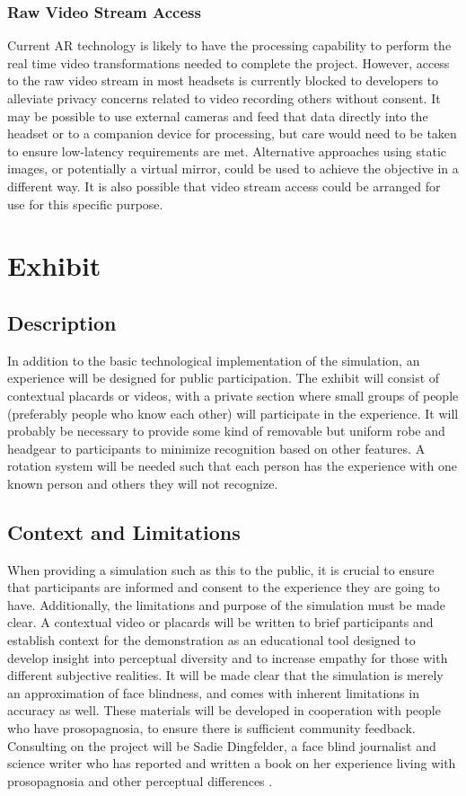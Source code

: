\documentclass{article}
\begin{document}
    \subsubsection{Raw Video Stream Access}
    Current AR technology is likely to have the processing capability to perform the real time video transformations needed to complete the project. However, access to the raw video stream in most headsets is currently blocked to developers to alleviate privacy concerns related to video recording others without consent. It may be possible to use external cameras and feed that data directly into the headset or to a companion device for processing, but care would need to be taken to ensure low-latency requirements are met. Alternative approaches using static images, or potentially a virtual mirror, could be used to achieve the objective in a different way. It is also possible that video stream access could be arranged for use for this specific purpose.

    \section{Exhibit}
    
    \subsection{Description}
    In addition to the basic technological implementation of the simulation, an experience will be designed for public participation. The exhibit will consist of contextual placards or videos, with a private section where small groups of people (preferably people who know each other) will participate in the experience. It will probably be necessary to provide some kind of removable but uniform robe and headgear to participants to minimize recognition based on other features. A rotation system will be needed such that each person has the experience with one known person and others they will not recognize.
    
    \subsection{Context and Limitations}
    When providing a simulation such as this to the public, it is crucial to ensure that participants are informed and consent to the experience they are going to have. Additionally, the limitations and purpose of the simulation must be made clear. A contextual video or placards will be written to brief participants and establish context for the demonstration as an educational tool designed to develop insight into perceptual diversity and to increase empathy for those with different subjective realities. It will be made clear that the simulation is merely an approximation of face blindness, and comes with inherent limitations in accuracy as well. These materials will be developed in cooperation with people who have prosopagnosia, to ensure there is sufficient community feedback. Consulting on the project will be Sadie Dingfelder, a face blind journalist and science writer who has reported and written a book on her experience living with prosopagnosia and other perceptual differences \cite{dingfelder_2024}.
    
\end{document}
